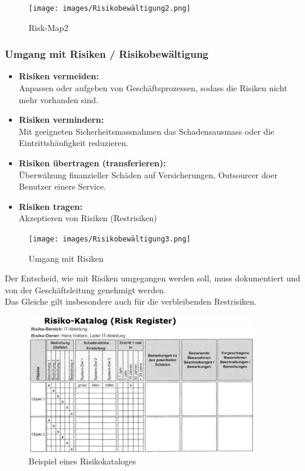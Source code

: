 \documentclass[10pt,a4paper]{article}
\begin{document}
\begin{figure}[H]
    \begin{center}
    \texttt{[image: images/Risikobewältigung2.png]}
    \caption{Risk-Map2}
    \label{Risk-Map2}
    \end{center}
\end{figure}

\subsubsection*{Umgang mit Risiken / Risikobewältigung}
\begin{itemize}[noitemsep,topsep=0pt,leftmargin=*]
    \item \textbf{Risiken vermeiden:}\\Anpassen oder aufgeben von Geschäftsprozessen, sodass die Risiken nicht mehr vorhanden sind.
    \item \textbf{Risiken vermindern:}\\Mit geeigneten Sicherheitsmassnahmen das Schadensausmass oder die Eintrittshäufigkeit reduzieren.
    \item \textbf{Risiken übertragen (transferieren):}\\Überwälzung finanzieller Schäden auf Versicherungen, Outsourcer doer Benutzer einers Service.
    \item \textbf{Risiken tragen:}\\Akzeptieren von Risiken (Restrisiken)
\end{itemize}

\begin{figure}[H]
    \begin{center}
    \texttt{[image: images/Risikobewältigung3.png]}
    \caption{Umgang mit Risiken}
    \label{Umgang mit Risiken}
    \end{center}
\end{figure}
\noindent
Der Entscheid, wie mit Risiken umgegangen werden soll, muss dokumentiert und von der Geschäftsleitung genehmigt werden.\\Das Gleiche gilt insbesondere auch für die verbleibenden Restrisiken.
\begin{figure}[H]
    \begin{center}
    \includegraphics[width=10cm]{images/Risiko-Katalog.png}
    \caption{Beispiel eines Risikokataloges}
    \label{risikokatalog}
    \end{center}
\end{figure}
\end{document}
